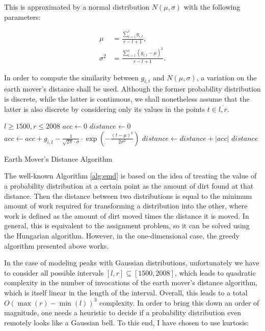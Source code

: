 This is approximated by a normal distribution $N \left( \mu, \sigma \right)$ with the following parameters:

\begin{align}
\label{eq:mu-gaussian-model}
\mu &= \frac{\sum_{t=l}^{r} g_{i, t}}{r - l + 1}, \\
\label{eq:sigma-gaussian-model}
\sigma^2 &= \frac{\sum_{t=l}^{r} \left( g_{i, t} - \mu \right)^2}{r - l + 1}.
\end{align}

In order to compute the similarity between $g_{i, t}$ and $N \left( \mu, \sigma \right)$, a variation on the earth mover's distance \cite{rubner98metric} shall be used. Although the former probability distribution is discrete, while the latter is continuous, we shall nonetheless assume that the latter is also discrete by considering only its values in the points $t \in \overline{l, r}$.

\begin{algorithm}

\begin{algorithmic}[1]
\Require $l \geq 1500, r \leq 2008$
\State $acc \gets 0$
\State $distance \gets 0$
    \State $acc \gets acc + g_{i, t} - \frac{1}{\sqrt{2 \pi} \cdot \sigma} \cdot \exp \left( - \frac{\left( t - \mu \right)^2}{2 \sigma^2} \right)$
    \State $distance \gets distance + \left| acc \right|$
\EndFor
\State \Return $distance$
\end{algorithmic}

\caption{Earth Mover's Distance Algorithm}
\label{alg:emd}

\end{algorithm}

The well-known Algorithm \autoref{alg:emd} is based on the idea of treating the value of a probability distribution at a certain point as the amount of dirt found at that distance. Then the distance between two distributions is equal to the minimum amount of work required for transforming a distribution into the other, where work is defined as the amount of dirt moved times the distance it is moved. In general, this is equivalent to the assignment problem, so it can be solved using the Hungarian algorithm. However, in the one-dimensional case, the greedy algorithm presented above works.

In the case of modeling peaks with Gaussian distributions, unfortunately we have to consider all possible intervals $\left[ l, r \right] \subseteq \left[ 1500, 2008 \right]$, which leads to quadratic complexity in the number of invocations of the earth mover's distance algorithm, which is itself linear in the length of the interval. Overall, this leads to a total $O \left( \max(r) - \min(l) \right)^3$ complexity. In order to bring this down an order of magnitude, one needs a heuristic to decide if a probability distribution even remotely looks like a Gaussian bell. To this end, I have chosen to use kurtosis:

